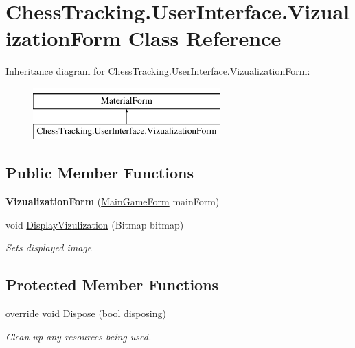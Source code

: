 \hypertarget{class_chess_tracking_1_1_user_interface_1_1_vizualization_form}{}\section{Chess\+Tracking.\+User\+Interface.\+Vizualization\+Form Class Reference}
\label{class_chess_tracking_1_1_user_interface_1_1_vizualization_form}
Inheritance diagram for Chess\+Tracking.\+User\+Interface.\+Vizualization\+Form\+:\begin{figure}[H]
\begin{center}
\leavevmode
\includegraphics[height=2.000000cm]{class_chess_tracking_1_1_user_interface_1_1_vizualization_form}
\end{center}
\end{figure}
\subsection*{Public Member Functions}
\begin{DoxyCompactItemize}
\item 
\mbox{\label{class_chess_tracking_1_1_user_interface_1_1_vizualization_form_ace7134626b825926f2802e5283bdd586}} 
{\bfseries Vizualization\+Form} (\mbox{\hyperlink{class_chess_tracking_1_1_user_interface_1_1_main_game_form}{Main\+Game\+Form}} main\+Form)
\item 
void \mbox{\hyperlink{class_chess_tracking_1_1_user_interface_1_1_vizualization_form_a8c3d81a6f3bea568c775beded3a5ba5f}{Display\+Vizulization}} (Bitmap bitmap)
\begin{DoxyCompactList}\small\item\em Sets displayed image \end{DoxyCompactList}\end{DoxyCompactItemize}
\subsection*{Protected Member Functions}
\begin{DoxyCompactItemize}
\item 
override void \mbox{\hyperlink{class_chess_tracking_1_1_user_interface_1_1_vizualization_form_af3ce7e01ed5eef3d8d42b47a040a94dd}{Dispose}} (bool disposing)
\begin{DoxyCompactList}\small\item\em Clean up any resources being used. \end{DoxyCompactList}\end{DoxyCompactItemize}
